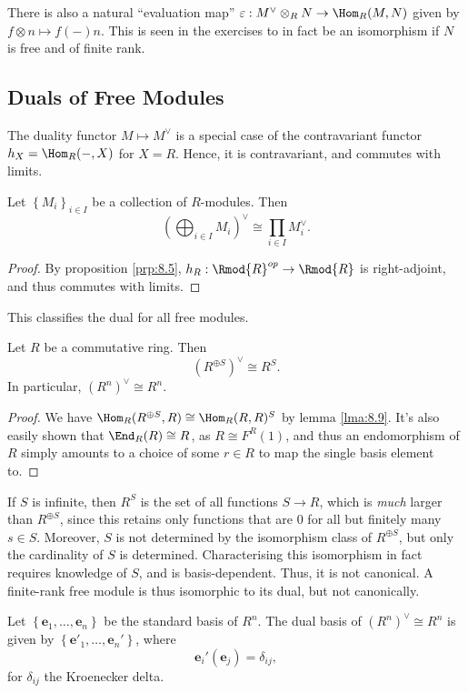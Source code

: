 There is also a natural ``evaluation map'' $\varepsilon : M^{\vee} \otimes _RN \to \Hom_{R}(M, N) $ given by $f\otimes n\mapsto f(-)n$. This is seen in the exercises to in fact be an isomorphism if $N$ is free and of finite rank.

\subsection{Duals of Free Modules}
The duality functor $M\mapsto M^{\vee} $ is a special case of the contravariant functor $h_X=\Hom_{R}(-, X) $ for $X=R$. Hence, it is contravariant, and commutes with limits.
\begin{lemma}\label{lma:8.9}
	Let $\left\{ M_i \right\}_{i\in I} $ be a collection of $R$-modules. Then
	\[
		\left( \bigoplus_{i\in I}M_i \right)^{\vee} \cong \prod_{i\in I} M_i^{\vee} 
	.\]
\end{lemma}
\begin{proof}
	By proposition \ref{prp:8.5}, $h_R : \Rmod{R} ^{op}  \to \Rmod{R} $ is right-adjoint, and thus commutes with limits.
\end{proof}
This classifies the dual for all free modules.
\begin{corollary}\label{cor:8.6}
	Let $R$ be a commutative ring. Then
	\[
		\left( R^{\oplus S}  \right) ^{\vee} \cong R^{S} 
	.\]
	In particular, $(R^n)^{\vee} \cong R^n$.
\end{corollary}
\begin{proof}
	We have $\Hom_{R}(R^{\oplus S} , R) \cong \Hom_{R}(R, R)^S$ by lemma \ref{lma:8.9}. It's also easily shown that $\End_{R}(R) \cong R$, as $R\cong F^R(1)$, and thus an endomorphism of $R$ simply amounts to a choice of some $r\in R$ to map the single basis element to.
\end{proof}
\begin{remark}
	If $S$ is infinite, then $R^S$ is the set of all functions $S\to R$, which is \emph{much} larger than $R^{\oplus S} $, since this retains only functions that are 0 for all but finitely many $s\in S$. Moreover, $S$ is not determined by the isomorphism class of $R^{\oplus S} $, but only the cardinality of $S$ is determined. Characterising this isomorphism in fact requires knowledge of $S$, and is basis-dependent. Thus, it is not canonical. A finite-rank free module is thus isomorphic to its dual, but not canonically.
\end{remark}

\begin{definition}\label{dfn:8.14}
	Let $\left\{ \mathbf{e} _1, \ldots, \mathbf{e}_n  \right\} $ be the standard basis of $R^n$. The dual basis of $\left( R^n \right)^{\vee} \cong R^n$ is given by $\left\{ \mathbf{e}'_1, \ldots , \mathbf{e}_n' \right\} $, where
	\[
		\mathbf{e}_i'(\mathbf{e}_j) = \delta_{ij} 
	,\]
	for $\delta_{ij} $ the Kroenecker delta.
\end{definition}

